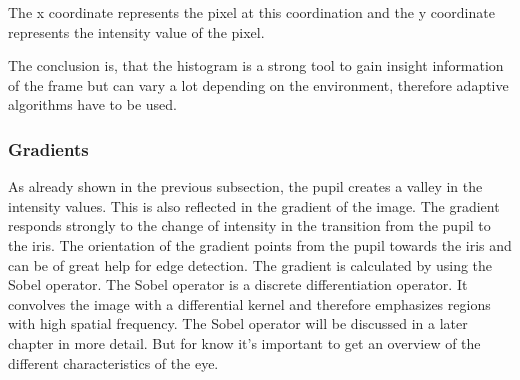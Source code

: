     The x coordinate represents the pixel at this coordination and the y coordinate represents the intensity value of the pixel. 

    The conclusion is, that the histogram is a strong tool to gain insight information of the frame but can vary a lot depending on the environment, therefore adaptive algorithms have to be used. 
    

   
    \subsubsection{Gradients}
    As already shown in the previous subsection, the pupil creates a valley in the intensity values. This is also reflected in the gradient of the image. The gradient responds strongly to the change of intensity in the transition from the pupil to the iris. The orientation of the gradient points from the pupil towards the iris and can be of great help for edge detection. The gradient is calculated by using the Sobel operator. The Sobel operator is a discrete differentiation operator. It convolves the image with a differential kernel and therefore emphasizes regions with high spatial frequency. The Sobel operator will be discussed in a later chapter in more detail. But for know it's important to get an overview of the different characteristics of the eye.

    

